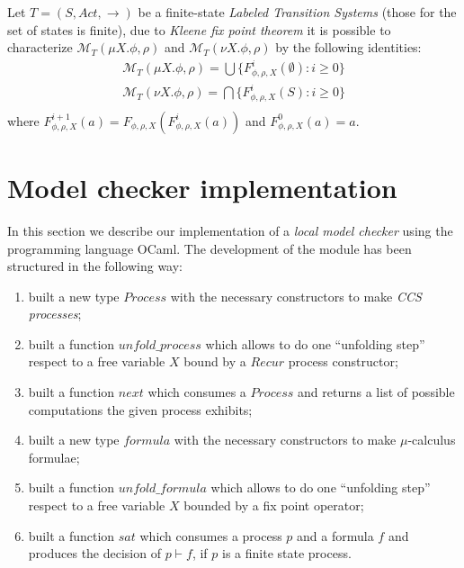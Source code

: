 Let $T = (S, Act, \rightarrow)$ be a finite-state \emph{Labeled
  Transition Systems} (those for the set of states is finite), due to
\emph{Kleene fix point theorem} it is possible to characterize $
\mathcal{M}_T(\mu X.\phi, \rho)$ and $ \mathcal{M}_T(\nu X.\phi,
\rho)$ by the following identities:
\begin{displaymath}
  \begin{split}
    \mathcal{M}_T(\mu X.\phi, \rho) = \bigcup \{F_{\phi, \rho,
      X}^i(\emptyset):i\geq 0\} \\
    \mathcal{M}_T(\nu X.\phi, \rho) = \bigcap \{F_{\phi, \rho,
      X}^i(S):i\geq 0\} \\
  \end{split}
\end{displaymath}
where $F_{\phi, \rho, X}^{i+1}(a) = F_{\phi, \rho, X}(F_{\phi, \rho,
  X}^i(a))$ and $F_{\phi, \rho, X}^0(a) = a$.

\section{Model checker implementation}

In this section we describe our implementation of a \emph{local model
  checker} using the programming language OCaml. The development of
the module has been structured in the following way:
\begin{enumerate}
\item built a new type $Process$ with the necessary constructors to
  make \emph{CCS processes};
\item built a function $unfold\_process$ which allows to do one
  ``unfolding step'' respect to a free variable $X$ bound by a $Recur$
  process constructor;
\item built a function $next$ which consumes a $Process$ and returns a
  list of possible computations the given process exhibits;
\item built a new type $formula$ with the necessary constructors to
  make $\mu$-calculus formulae;
\item built a function $unfold\_formula$ which allows to do one
  ``unfolding step'' respect to a free variable $X$ bounded by a fix
  point operator;
\item built a function $sat$ which consumes a process $p$ and a
  formula $f$ and produces the decision of $p \vdash f$, if $p$ is a
  finite state process.
\end{enumerate}

